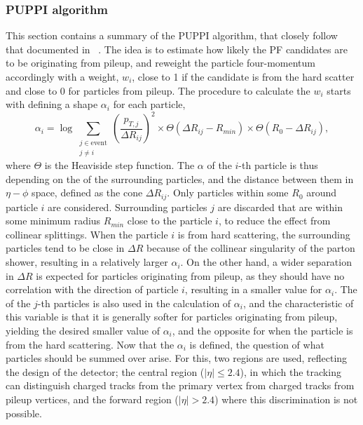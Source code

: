 \subsubsection*{PUPPI algorithm}
\noindent
\justify
This section contains a summary of the PUPPI algorithm, that closely follow that documented in ~\cite{Bertolini:2014bba}. 
The idea is to estimate how likely the PF candidates are to be originating from pileup, and reweight the particle four-momentum accordingly with a weight, $w_{i}$, close to 1 if the candidate is from the hard scatter and close to 0 for particles from pileup. 
The procedure to calculate the $w_{i}$ starts with defining a shape $\alpha_{i}$ for each particle, 
\begin{equation}
  \alpha_i = \log \sum_{\substack{j \in \text{event} \\ j \neq i}} \left(\frac{p_{T, j}}{\Delta R_{ij}}\right)^{2} \times \Theta(\Delta R_{ij}-R_{min})\times \Theta(R_{0}-\Delta R_{ij}),
\end{equation}
where $\Theta$ is the Heaviside step function. 
The $\alpha$ of the $i$-th particle is thus depending on the \pt of the surrounding particles, and the distance between them in $\eta-\phi$ space, defined as the cone $\Delta R_{ij}$.
Only particles within some $R_{0}$ around particle $i$ are considered. 
Surrounding particles $j$ are discarded that are within some minimum radius $R_{min}$ close to the particle $i$, to reduce the effect from collinear splittings. 
When the particle $i$ is from hard scattering, the surrounding particles tend to be close in $\Delta R$ because of the collinear singularity of the parton shower, resulting in a relatively larger $\alpha_{i}$. 
On the other hand, a wider separation in $\Delta R$ is expected for particles originating from pileup, as they should have no correlation with the direction of particle $i$, resulting in a smaller value for $\alpha_{i}$. 
The \pt of the $j$-th particles is also used in the calculation of $\alpha_{i}$, and the characteristic of this variable is that it is generally softer for particles originating from pileup, yielding the desired smaller value of $\alpha_{i}$, and the opposite for when the particle is from the hard scattering. 
Now that the $\alpha_{i}$ is defined, the question of what particles should be summed over arise. 
For this, two regions are used, reflecting the design of the detector; the central region ($|\eta|\leq2.4$), in which the tracking can distinguish charged tracks from the primary vertex from charged tracks from pileup vertices, and the forward region ($|\eta|>2.4$) where this discrimination is not possible.
